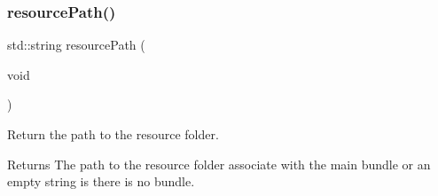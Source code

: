 \subsubsection{\texorpdfstring{resource\+Path()}{resourcePath()}}
{\footnotesize\ttfamily std\+::string resource\+Path (\begin{DoxyParamCaption}\item[{void}]{ }\end{DoxyParamCaption})}



Return the path to the resource folder. 

\begin{DoxyReturn}{Returns}
The path to the resource folder associate with the main bundle or an empty string is there is no bundle. \begin{DoxyVerb}\end{DoxyVerb}
 
\end{DoxyReturn}
